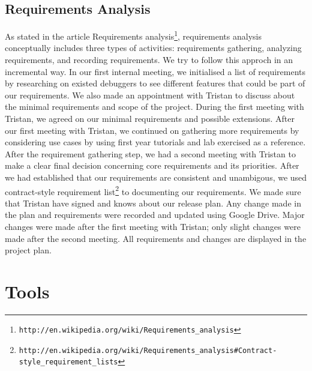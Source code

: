 \documentclass[11pt, a4paper]{article}
\begin{document}
\subsection{Requirements Analysis}
As stated in the article Requirements analysis\footnote{\tt{http://en.wikipedia.org/wiki/Requirements\_analysis}}, requirements analysis conceptually includes three types of activities: requirements gathering, analyzing requirements, and recording requirements. We try to follow this approch in an incremental way. In our first internal meeting, we initialised a list of requirements by researching on existed debuggers to see different features that could be part of our requirements. We also made an appointment with Tristan to discuss about the minimal requirements and scope of the project. During the first meeting with Tristan, we agreed on our minimal requirements and possible extensions. After our first meeting with Tristan, we continued on gathering more requirements by considering use cases by using first year tutorials and lab exercised as a reference.
After the requirement gathering step, we had a second meeting with Tristan to make a clear final decision concerning core requirements and its priorities. After we had established that our requirements are consistent and unambigous, we used contract-style requirement list\footnote{\tt{http://en.wikipedia.org/wiki/Requirements\_analysis\#Contract-style\_requirement\_lists}} to documenting our requirements. We made sure that Tristan have signed and knows about our release plan.
Any change made in the plan and requirements were recorded and updated using Google Drive. Major changes were made after the first meeting with Tristan; only slight changes were made after the second meeting.
All requirements and changes are displayed in the project plan.

\section{Tools}
\end{document}
